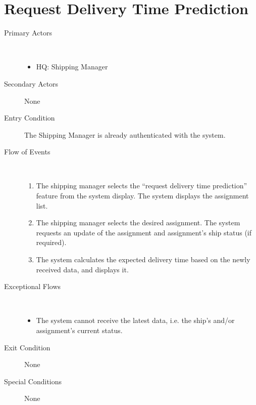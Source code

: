\documentclass[a4paper,10pt]{report}
\begin{document}
\section{Request Delivery Time Prediction}
\begin{description}
\item[Primary Actors] \
  \begin{itemize}
  \item HQ: Shipping Manager
  \end{itemize}
\item[Secondary Actors] None
\item[Entry Condition]
  The Shipping Manager is already authenticated with the system.
\item[Flow of Events] \
  \begin{enumerate}
    \item The shipping manager selects the ``request delivery time prediction'' feature from the system display. The system displays the assignment list.
    \item The shipping manager selects the desired assignment. The system requests an update of the assignment and assignment's ship status (if required).
    \item The system calculates the expected delivery time based on the newly received data, and displays it.
  \end{enumerate}
\item[Exceptional Flows] \
  \begin{itemize}
  \item The system cannot receive the latest data, i.e. the ship's and/or assignment's current status.
  \end{itemize}
\item[Exit Condition] None
\item[Special Conditions] None
\end{description}
\end{document}
